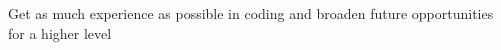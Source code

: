 

\begin{cvparagraph}

Get as much experience as possible in coding and broaden future opportunities for a higher level

\end{cvparagraph}
